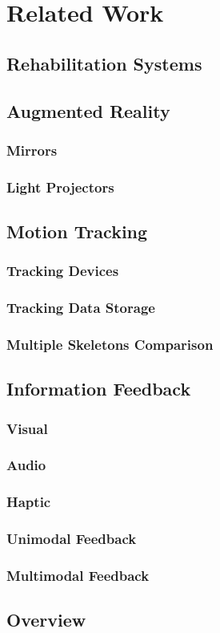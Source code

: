 \section{Related Work}
\label{section-relatedwork}

\subsection{Rehabilitation Systems}

\subsection{Augmented Reality}
\subsubsection{Mirrors}
\subsubsection{Light Projectors}

\subsection{Motion Tracking}
\subsubsection{Tracking Devices}
\subsubsection{Tracking Data Storage}
\subsubsection{Multiple Skeletons Comparison}

\subsection{Information Feedback}
\subsubsection{Visual}
\subsubsection{Audio}
\subsubsection{Haptic}
\subsubsection{Unimodal Feedback}
\subsubsection{Multimodal Feedback}

\subsection{Overview}